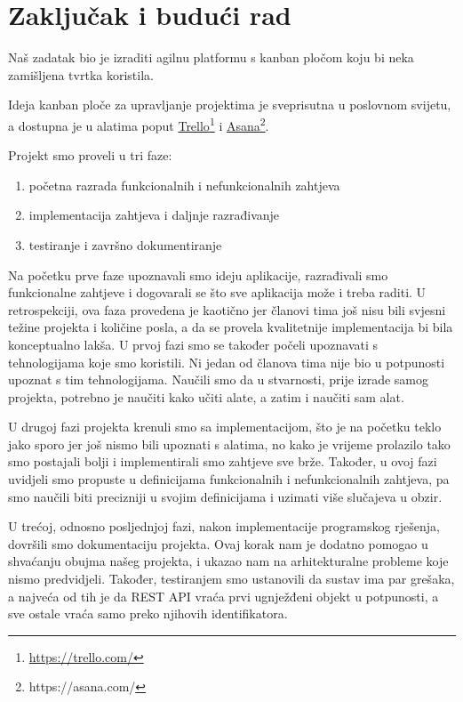 \chapter{Zaključak i budući rad}
	Naš zadatak bio je izraditi agilnu platformu s kanban pločom koju bi neka zamišljena tvrtka koristila.
	
	Ideja kanban ploče za upravljanje projektima je sveprisutna u poslovnom svijetu, a dostupna je u alatima poput \underline{Trello}\footnote{\url{https://trello.com/}} i \underline{Asana}\footnote{https://asana.com/}.
	
	Projekt smo proveli u tri faze:
	\begin{enumerate}
		\item početna razrada funkcionalnih i nefunkcionalnih zahtjeva
		\item implementacija zahtjeva i daljnje razrađivanje
		\item testiranje i završno dokumentiranje
	\end{enumerate} 

	Na početku prve faze upoznavali smo ideju aplikacije, razrađivali smo funkcionalne zahtjeve i dogovarali se što sve aplikacija može i treba raditi. U retrospekciji, ova faza provedena je kaotično jer članovi tima još nisu bili svjesni težine projekta i količine posla, a da se provela kvalitetnije implementacija bi bila konceptualno lakša. U prvoj fazi smo se također počeli upoznavati s tehnologijama koje smo koristili. Ni jedan od članova tima nije bio u potpunosti upoznat s tim tehnologijama. Naučili smo da u stvarnosti, prije izrade samog projekta, potrebno je naučiti kako učiti alate, a zatim i naučiti sam alat.
	
	U drugoj fazi projekta krenuli smo sa implementacijom, što je na početku teklo jako sporo jer još nismo bili upoznati s alatima, no kako je vrijeme prolazilo tako smo postajali bolji i implementirali smo zahtjeve sve brže. Također, u ovoj fazi uvidjeli smo propuste u definicijama funkcionalnih i nefunkcionalnih zahtjeva, pa smo naučili biti precizniji u svojim definicijama i uzimati više slučajeva u obzir. 
	
	U trećoj, odnosno posljednjoj fazi, nakon implementacije programskog rješenja, dovršili smo dokumentaciju projekta. Ovaj korak nam je dodatno pomogao u shvaćanju obujma našeg projekta, i ukazao nam na arhitekturalne probleme koje nismo predvidjeli. Također, testiranjem smo ustanovili da sustav ima par grešaka, a najveća od tih je da REST API vraća prvi ugnježđeni objekt u potpunosti, a sve ostale vraća samo preko njihovih identifikatora.
	
